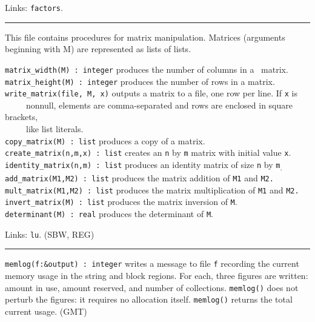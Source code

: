 Links: \texttt{factors}. 

\vspace{0.25cm}\hrule{}

This file contains procedures for matrix
manipulation. Matrices (arguments beginning with M) are represented as
lists of lists.

\texttt{matrix\_width(M) : integer} produces the number of columns in a
\ matrix.\\
\texttt{matrix\_height(M) : integer} produces the number of rows in a
matrix.\\
\texttt{write\_matrix(file, M, x)} outputs a matrix to a file, one row
per line. If \texttt{x} is\\
 \ \ \ \ \ nonnull, elements are comma-separated and rows are enclosed
in square brackets,\\
 \ \ \ \ \ like list literals.\\
\texttt{copy\_matrix(M) : list} produces a copy of a matrix.\\
\texttt{create\_matrix(n,m,x) : list} creates an \texttt{n} by
\texttt{m} matrix with initial value \texttt{x}.\\
\texttt{identity\_matrix(n,m) : list} produces an identity matrix of
size \texttt{n} by \texttt{m}\textsubscript{.}\\
\texttt{add\_matrix(M1,M2) : list} produces the matrix addition of
\texttt{M1} and \texttt{M2.}\\
\texttt{mult\_matrix(M1,M2) : list} produces the matrix multiplication
of \texttt{M1} and \texttt{M2.}\\
\texttt{invert\_matrix(M) : list} produces the matrix inversion of
\texttt{M}.\\
\texttt{determinant(M) : real} produces the determinant of \texttt{M}.

Links: \texttt{lu}. (SBW, REG)

\vspace{0.25cm}\hrule{}

\texttt{memlog(f:\&output) : integer} writes a message to file
\texttt{f} recording the current memory usage in the string and block
regions. For each, three figures are written: amount in use, amount
reserved, and number of collections. \texttt{memlog()} does not perturb
the figures: it requires no allocation itself. \texttt{memlog()}
returns the total current usage. (GMT)

